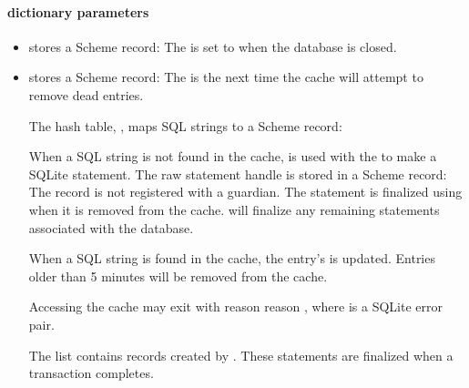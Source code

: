 \paragraph* {dictionary parameters}
\begin{itemize}

\item {} stores a Scheme record:\newline
  \newline The  is set to  when
  the database is closed.

\item {} stores a Scheme record:\newline
  \newline
  The  is the next time the cache will attempt to
  remove dead entries.

  The hash table, , maps SQL strings to a Scheme
  record:\newline {}\newline

  When a SQL string is not found in the cache,
   is used with the
   to make a SQLite statement. The raw
  statement handle is stored in a Scheme record:\newline
  \newline The  record is
  not registered with a guardian. The statement is finalized using
   when it is removed from the
  cache.  will finalize any remaining
  statements associated with the database.

  When a SQL string is found in the cache, the entry's
   is updated. Entries older than 5 minutes will
  be removed from the cache.

  Accessing the cache may exit with reason reason
  , where
   is a SQLite error pair.

  The  list contains 
  records created by . These statements are
  finalized when a transaction completes.

\end{itemize}

